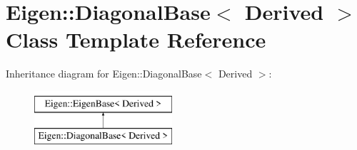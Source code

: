 \hypertarget{class_eigen_1_1_diagonal_base}{}\section{Eigen\+::Diagonal\+Base$<$ Derived $>$ Class Template Reference}
\label{class_eigen_1_1_diagonal_base}
Inheritance diagram for Eigen\+::Diagonal\+Base$<$ Derived $>$\+:\begin{figure}[H]
\begin{center}
\leavevmode
\includegraphics[height=2.000000cm]{class_eigen_1_1_diagonal_base}
\end{center}
\end{figure}
